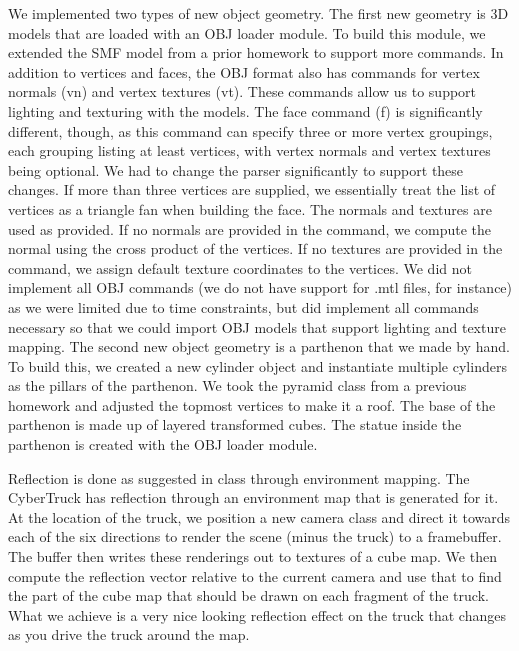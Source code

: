 \documentclass[10pt,letterpaper,oneside]{article}
\numberwithin{equation}{section}		%
\numberwithin{figure}{section}			%
\numberwithin{table}{section}				%
\begin{document}
We implemented two types of new object geometry. The first new geometry is 3D models that are loaded with an OBJ loader module. To build this module, we extended the SMF model from a prior homework to support more commands. In addition to vertices and faces, the OBJ format also has commands for vertex normals (vn) and vertex textures (vt). These commands allow us to support lighting and texturing with the models. The face command (f) is significantly different, though, as this command can specify three or more vertex groupings, each grouping listing at least vertices, with vertex normals and vertex textures being optional. We had to change the parser significantly to support these changes. If more than three vertices are supplied, we essentially treat the list of vertices as a triangle fan when building the face. The normals and textures are used as provided. If no normals are provided in the command, we compute the normal using the cross product of the vertices. If no textures are provided in the command, we assign default texture coordinates to the vertices. We did not implement all OBJ commands (we do not have support for .mtl files, for instance) as we were limited due to time constraints, but did implement all commands necessary so that we could import OBJ models that support lighting and texture mapping. The second new object geometry is a parthenon that we made by hand. To build this, we created a new cylinder object and instantiate multiple cylinders as the pillars of the parthenon. We took the pyramid class from a previous homework and adjusted the topmost vertices to make it a roof. The base of the parthenon is made up of layered transformed cubes. The statue inside the parthenon is created with the OBJ loader module.


Reflection is done as suggested in class through environment mapping. The CyberTruck has reflection through an environment map that is generated for it. At the location of the truck, we position a new camera class and direct it towards each of the six directions to render the scene (minus the truck) to a framebuffer. The buffer then writes these renderings out to textures of a cube map. We then compute the reflection vector relative to the current camera and use that to find the part of the cube map that should be drawn on each fragment of the truck. What we achieve is a very nice looking reflection effect on the truck that changes as you drive the truck around the map.
\end{document}
